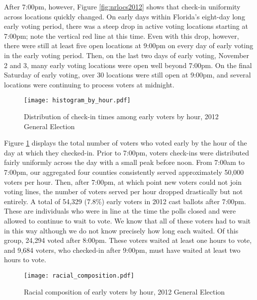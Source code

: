\documentclass[12pt,titlepage]{article}
\begin{document}
After 7:00pm, however, Figure \ref{fig:nrlocs2012} shows that check-in
uniformity across locations quickly changed.  On early days within
Florida's eight-day long early voting period, there was a steep drop
in active voting locations starting at 7:00pm; note the vertical red
line at this time.  Even with this drop, however, there were still at
least five open locations at 9:00pm on every day of early voting in
the early voting period.  Then, on the last two days of early voting,
November 2 and 3, many early voting locations were open well beyond
7:00pm.  On the final Saturday of early voting, over 30 locations were
still open at 9:00pm, and several locations were continuing to process
voters at midnight.

\begin{figure}[!ht]
\caption{Distribution of check-in times among early voters by hour, 2012
  General Election}
  \label{fig:hist2012}
  \centering
    \centering\texttt{[image: histogram\_by\_hour.pdf]}
\end{figure}

Figure \ref{fig:hist2012} displays the total number of voters who
voted early by the hour of the day at which they checked-in. Prior to
7:00pm, voters check-ins were distributed fairly uniformly across the
day with a small peak before noon.  From 7:00am to 7:00pm, our
aggregated four counties consistently served approximately 50,000
voters per hour. Then, after 7:00pm, at which point new voters could
not join voting lines, the number of voters served per hour dropped
drastically but not entirely.  A total of 54,329 (7.8\%) early voters
in 2012 cast ballots after 7:00pm. These are individuals who were in
line at the time the polls closed and were allowed to continue to wait
to vote.  We know that all of these voters had to wait in this way
although we do not know precisely how long each waited.  Of this
group, 24,294 voted after 8:00pm.  These voters waited at least one
hours to vote, and 9,684 voters, who checked-in after 9:00pm, must
have waited at least two hours to vote.




\begin{figure}[!ht]
\caption{Racial composition of early voters by hour, 2012 General Election}
  \label{fig:race2012}
  \centering
    \centering\texttt{[image: racial\_composition.pdf]}
\end{figure}
\end{document}
